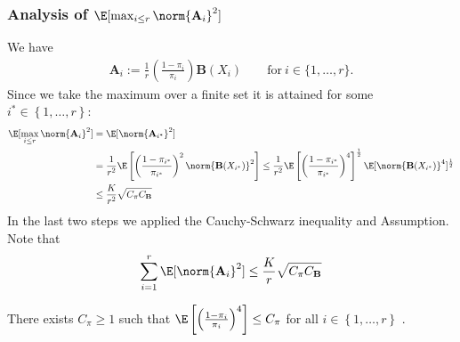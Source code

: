 \subsubsection*{
  Analysis of 
  $
  \E[\max_{i \le r}\norm{\mathbf{A}_i}^2]
  $
}
We have
\begin{gather}
  \mathbf{A}_i
  :=
  \frac{1}{r}
  \left( 
    \frac{1-\pi_i}{\pi_i}
  \right)
  \mathbf{B}(X_i)
  \qquad
  \text{for}
  \ 
  i\in \{1, \ldots, r\}.
\end{gather}
Since we take the maximum over a finite set it is attained for some 
$i^*\in \left\{ 1, \ldots, r \right\}$:
\begin{align}
  \begin{split}
  \E[\max_{i \le r}\norm{\mathbf{A}_i}^2]
  &=
  \E[\norm{\mathbf{A}_{i^*}}^2]
  \\
  &=
  \frac{1}{r^2}
  \E \left[ 
    \left(
      \frac{1-\pi_{i^*}}{\pi_{i^*}}
    \right)^2
    \norm{\mathbf{B}(X_{i^*})}^2
  \right]
  \le
  \frac{1}{r^2}
  \E \left[ 
    \left(
      \frac{1-\pi_{i^*}}{\pi_{i^*}}
    \right)^4
  \right]^\frac{1}{2}
  \E[
    \norm{\mathbf{B}(X_{i^*})}^4
  ]^\frac{1}{2}
  \\
  &\le
  \frac{K}{r^2}\sqrt{C_\pi C_\mathbf{B}}
\end{split}
\end{align}
In the last two steps we applied the Cauchy-Schwarz inequality
and Assumption. Note that
\begin{gather}
  \sum_{i=1}^{r}
  \E[\norm{\mathbf{A}_i}^2]\le
  \frac{K}{r}\sqrt{C_\pi C_\mathbf{B}}
\end{gather}
\begin{assumption}
  There exists $C_\pi \ge 1$ such that
  $
    \E
    \left[ 
    \left(
      \frac{1-\pi_{i}}{\pi_{i}}
    \right)^4
    \right]
    \le C_\pi
  $
  for all $i\in \left\{ 1, \ldots, r \right\}$
  .
\end{assumption}
 
